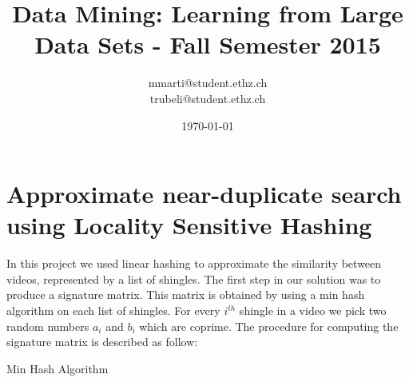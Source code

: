 \documentclass[a4paper, 11pt]{article}
\title{Data Mining: Learning from Large Data Sets - Fall Semester 2015}
\author{mmarti@student.ethz.ch\\ trubeli@student.ethz.ch\\}
\date{\today}
\begin{document}
\maketitle

\section*{Approximate near-duplicate search using Locality Sensitive Hashing} 
In this project we used linear hashing to approximate the similarity between videos, represented by a list of shingles. The first step in our solution was to produce a signature matrix. This matrix is obtained by using a min hash algorithm on each list of shingles. For every $i^{th}$ shingle in a video we pick two random numbers $a_{i}$ and $b_{i}$ which are coprime. The procedure for computing the signature matrix is described as follow:
\vspace{10mm}
\begin{algorithm}
	\caption{Min Hash Algorithm}\label{euclid}
	\begin{algorithmic}[1]
			\EndIf
			\EndFor
		\EndFor
	
		\EndProcedure
	\end{algorithmic}
\end{algorithm}
\end{document}
